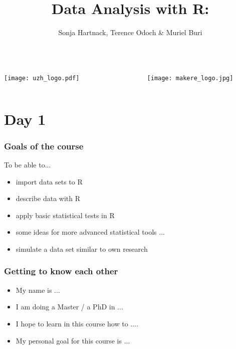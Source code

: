 \documentclass{beamer}\usepackage[]{graphicx}\usepackage[]{color}
\title{\textbf{Data Analysis with R:} \\ \lecturetopic}
\author{Sonja Hartnack, Terence Odoch \& Muriel Buri}
\institute{October 2017}
\date{ }
\begin{document}



\begin{frame}
\begin{columns}
\begin{column}{.3\linewidth}
\begin{center}
\texttt{[image: uzh\_logo.pdf]}
\end{center}
\end{column}
\begin{column}{0.2\linewidth}
\end{column}
\begin{column}{.3\linewidth}
\begin{center}
\texttt{[image: makere\_logo.jpg]}
\end{center}
\end{column}
\end{columns}
\titlepage
\end{frame}

\section{Day 1}
\usebackgroundtemplate{}
\begin{frame}
\frametitle{Goals of the course}
To be able to...
\begin{itemize}
\setlength\itemsep{1.5em}
\item import data sets to R
\item describe data with R
\item apply basic statistical tests in R
\item some ideas for more advanced statistical tools ...
\item simulate a data set similar to own research
\end{itemize}
\end{frame}


\begin{frame}
\frametitle{Getting to know each other}
\begin{itemize}
\setlength\itemsep{1.5em}
\item My name is ...
\item I am doing a Master / a PhD in ...
\item I hope to learn in this course how to ....
\item My personal goal for this course is ...
\end{itemize}
\end{frame}
\end{document}
